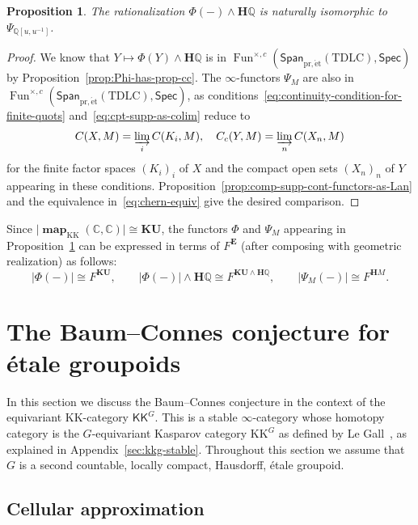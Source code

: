 \documentclass[a4paper,reqno]{amsart}
\theoremstyle{plain}
\newtheorem{proposition}[theorem]{Proposition}
\theoremstyle{definition}
\theoremstyle{remark}
\numberwithin{equation}{section}
\newcommand{\dC}{\mathbb{C}}
\newcommand{\dQ}{\mathbb{Q}}
\newcommand{\bE}{\mathbf{E}}
\newcommand{\bH}{\mathbf{H}}
\newcommand{\Spec}{\mathsf{Spec}}
\newcommand{\Span}{\mathsf{Span}}
\newcommand{\KK}{\mathrm{KK}}
\newcommand{\icKK}{\mathsf{KK}}
\newcommand{\gr}[1]{\lvert #1\rvert}
\newcommand{\KU}{\mathbf{KU}}
\newcommand{\pret}{\mathrm{pr,\acute{e}t}}
\newcommand{\TDLC}{\mathrm{TDLC}}
\DeclareMathOperator{\Fun}{Fun}
\DeclareMathOperator{\map}{\mathbf{map}}
\begin{document}
\begin{proposition}\label{prop:final-transfer}
The rationalization $\Phi(-) \wedge \bH\dQ$ is naturally isomorphic to $\Psi_{\dQ[u, u^{-1}]}$.
\end{proposition}

\begin{proof}
We know that $Y \mapsto \Phi(Y) \wedge \bH\dQ$ is in $\Fun^{\times,c}(\Span_{\pret}(\TDLC), \Spec)$ by Proposition~\ref{prop:Phi-has-prop-cc}.
The $\infty$-functors $\Psi_M$ are also in $\Fun^{\times,c}(\Span_{\pret}(\TDLC), \Spec)$, as conditions~\eqref{eq:continuity-condition-for-finite-quots} and~\eqref{eq:cpt-supp-as-colim} reduce to
\[
C(X, M) = \varinjlim_i C(K_i, M), \quad
C_c(Y, M) = \varinjlim_n C(X_n, M)
\]
for the finite factor spaces $(K_i)_i$ of $X$ and the compact open sets $(X_n)_n$ of $Y$ appearing in these conditions.
Proposition~\ref{prop:comp-supp-cont-functors-as-Lan} and the equivalence in~\eqref{eq:chern-equiv} give the desired comparison.
\end{proof}

Since $\gr{\map_{\KK}(\dC, \dC)}\cong \KU$, the functors $\Phi$ and $\Psi_M$ appearing in Proposition~\ref{prop:final-transfer} can be expressed in terms of $F^\bE$ (after composing with geometric realization) as follows:
\begin{equation}\label{eq:feid}
\gr{\Phi(-)} \cong F^{\KU},\qquad \gr{\Phi(-)} \wedge \bH\dQ \cong F^{\KU\wedge \bH\dQ},\qquad \gr{\Psi_M(-)}\cong F^{\bH M}. 
\end{equation}

\section{The Baum--Connes conjecture for étale groupoids}\label{sec:bc-conj}

In this section we discuss the Baum--Connes conjecture in the context of the equivariant $\KK$-category $\icKK^G$. This is a stable $\infty$-category whose homotopy category is the $G$-equivariant Kasparov category $\KK^G$ as defined by Le Gall~\cite{lg:kk}, as explained in Appendix~\ref{sec:kkg-stable}.
Throughout this section we assume that $G$ is a second countable, locally compact, Hausdorff, étale groupoid.

\subsection{Cellular approximation}\label{subsec:capp}
\end{document}
